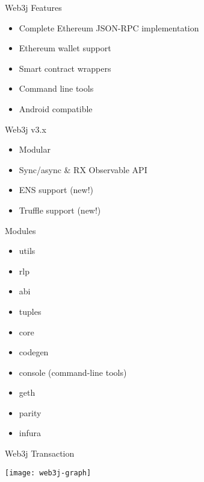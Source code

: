 \documentclass{beamer}
\begin{document}
\begin{frame}{Web3j Features}
	\begin{itemize}
		\item {
			Complete Ethereum JSON-RPC implementation
		}
		\item {
			Ethereum wallet support
		}
		\item {
			Smart contract wrappers
		}
		\item {
			Command line tools
		}
		\item {
			Android compatible
		}
	\end{itemize}
\end{frame}

\begin{frame}{Web3j v3.x}
	\begin{itemize}
		\item {
			Modular
		}
		\item {
			Sync/async \& RX Observable API
		}
		\item {
			ENS support (new!)
		}
		\item {
			Truffle support (new!)
		}
	\end{itemize}
\end{frame}

\begin{frame}{Modules}
	\begin{multicols}{2}
		\begin{itemize}
			\item {
				utils
			}
			\item {
				rlp
			}
			\item {
				abi
			}
			\item {
				tuples
			}	
			\item {
				core
			}
			\item {
				codegen
			}
			\item {
				console (command-line tools)
			}
			\item {
				geth
			}
			\item {
				parity
			}
			\item {
				infura
			}
		\end{itemize}
	\end{multicols}
\end{frame}

\begin{frame}{Web3j Transaction}
	\begin{center}
		\texttt{[image: web3j-graph]}
	\end{center}
\end{frame}
\end{document}
